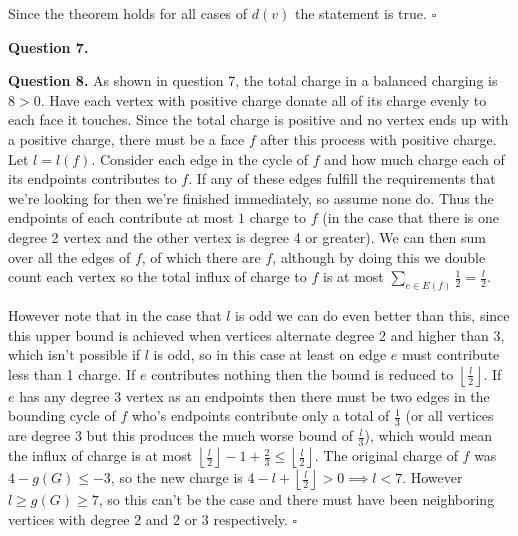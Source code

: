 \documentclass[letterpaper, reqno,11pt]{article}
\begin{document}
\medskip

Since the theorem holds for all cases of $d(v)$ the statement is true. $\square$

{\medskip\noindent\bf Question 7.}  

{\medskip\noindent\bf Question 8.} As shown in question 7, the total charge in a balanced charging is $8>0$. Have each vertex with positive charge donate all of its charge evenly to each face it touches. Since the total charge is positive and no vertex ends up with a positive charge, there must be a face $f$ after this process with positive charge. Let $l=l(f)$. Consider each edge in the cycle of $f$ and how much charge each of its endpoints contributes to $f$. If any of these edges fulfill the requirements that we're looking for then we're finished immediately, so assume none do. Thus the endpoints of each contribute at most $1$ charge to $f$ (in the case that there is one degree 2 vertex and the other vertex is degree 4 or greater). We can then sum over all the edges of $f$, of which there are $f$, although by doing this we double count each vertex so the total influx of charge to $f$ is at most $\sum_{e\in E(f)}\frac{1}{2}=\frac{l}{2}$. 

However note that in the case that $l$ is odd we can do even better than this, since this upper bound is achieved when vertices alternate degree 2 and higher than 3, which isn't possible if $l$ is odd, so in this case at least on edge $e$ must contribute less than 1 charge. If $e$ contributes nothing then the bound is reduced to $\left\lfloor \frac{l}{2} \right\rfloor$. If $e$ has any degree 3 vertex as an endpoints then there must be two edges in the bounding cycle of $f$ who's endpoints contribute only a total of $\frac{1}{3}$ (or all vertices are degree 3 but this produces the much worse bound of $\frac{l}{3}$), which would mean the influx of charge is at most $\left\lfloor \frac{l}{2} \right\rfloor-1+\frac{2}{3}\leq \left\lfloor \frac{l}{2} \right\rfloor$. The original charge of $f$ was $4-g(G)\leq -3$, so the new charge is $4-l+\left\lfloor \frac{l}{2} \right\rfloor >0\implies l<7$. However $l\geq g(G)\geq 7$, so this can't be the case and there must have been neighboring vertices with degree $2$ and $2$ or $3$ respectively. $\square$
\end{document}
